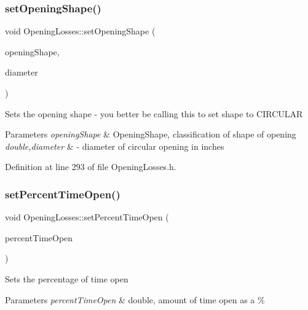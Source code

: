 \subsubsection{\texorpdfstring{set\+Opening\+Shape()}{setOpeningShape()}\hspace{0.1cm}{\footnotesize\ttfamily [6/6]}}
{\footnotesize\ttfamily void Opening\+Losses\+::set\+Opening\+Shape (\begin{DoxyParamCaption}\item[{\hyperlink{class_opening_losses_a57f9759b6fd72a1b75aa885800e26157}{Opening\+Shape} const}]{opening\+Shape,  }\item[{const double}]{diameter }\end{DoxyParamCaption})\hspace{0.3cm}{\ttfamily [inline]}}

Sets the opening shape -\/ you better be calling this to set shape to C\+I\+R\+C\+U\+L\+AR 
\begin{DoxyParams}{Parameters}
{\em opening\+Shape} & Opening\+Shape, classification of shape of opening \\
\hline
{\em double,diameter} & -\/ diameter of circular opening in inches \\
\hline
\end{DoxyParams}


Definition at line 293 of file Opening\+Losses.\+h.

\mbox{\label{class_opening_losses_a889b6aa25bf6d8fc8fb284ec0c2a1625}} 
\subsubsection{\texorpdfstring{set\+Percent\+Time\+Open()}{setPercentTimeOpen()}\hspace{0.1cm}{\footnotesize\ttfamily [1/3]}}
{\footnotesize\ttfamily void Opening\+Losses\+::set\+Percent\+Time\+Open (\begin{DoxyParamCaption}\item[{double}]{percent\+Time\+Open }\end{DoxyParamCaption})\hspace{0.3cm}{\ttfamily [inline]}}

Sets the percentage of time open 
\begin{DoxyParams}{Parameters}
{\em percent\+Time\+Open} & double, amount of time open as a \% \\
\hline
\end{DoxyParams}


